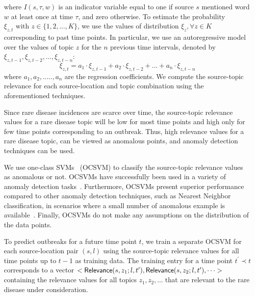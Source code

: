\documentclass[twoside,leqno,twocolumn]{article}
\begin{document}
\noindent where $I(s,\tau,w)$ is an indicator variable equal to one if source $s$ mentioned word $w$ at least once at time $\tau$, and zero otherwise. 
To estimate the probability $\xi_{z,t} \mbox{ with } z \in \{1, 2, \dots, K\}$, 
we use the values of distribution $\xi_{z}, \forall z \in K$ corresponding to past time points. In particular, we use an autoregressive model over the values of topic $z$ for the $n$ previous time intervals, denoted by $\xi_{z,t-1},\xi_{z,t-2},\dots,\xi_{z,t-n}$:
\begin{equation}
\xi_{z,t}=a_1 \cdot \xi_{z,t-1}+a_2\cdot \xi_{z,t-2}+\dots +a_n\cdot \xi_{z,t-n}
\end{equation}
where $a_1,a_2,.....,a_n$ are the regression coefficients. We compute the source-topic relevance for each source-location and topic combination using the aforementioned techniques.

Since rare disease incidences are scarce over time, the source-topic relevance values for a rare disease topic will be low for most time points and high only for few time points corresponding to an outbreak. Thus, high relevance values for a rare disease topic, can be viewed as anomalous points, and anomaly detection techniques can be used.

We use one-class SVMs~\cite{schoelkopf:99} (OCSVM) to classify the source-topic relevance values as anomalous or not. OCSVMs have successfully been used in a variety of anomaly detection tasks~\cite{manevitz:2002, heller:03,steinwart:05}. Furthermore, OCSVMs present superior performance compared to other anomaly detection techniques, such as Nearest Neighbor classification, in scenarios where a small number of anomalous example is available~\cite{khan:13}. Finally, OCSVMs do not make any assumptions on the distribution of the data points.


To predict outbreaks for a future time point $t$, we train a separate OCSVM for each source-location pair $(s, l)$ using the source-topic relevance values for all time points up to $t-1$ as training data.  The training entry for a time point $t^{\prime} \prec t$ corresponds to a vector $<{\sf Relevance}(s,z_1;l,t^{\prime}), {\sf Relevance}(s,z_2;l,t^{\prime}), \dots>$ containing the relevance values for all topics $z_1, z_2, \dots$ that are relevant to the rare disease under consideration. 
\end{document}
